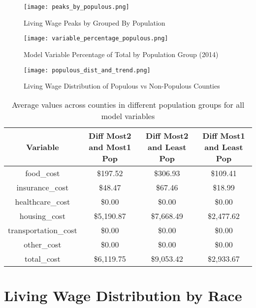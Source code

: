 \begin{figure}[H]
    \centering
        \texttt{[image: peaks\_by\_populous.png]}
        \caption{Living Wage Peaks by Grouped By Population}
    \label{f:ch4_peaks_by_populous}
\end{figure}

\begin{figure}[H]
    \centering
        \texttt{[image: variable\_percentage\_populous.png]}
        \caption{Model Variable Percentage of Total by Population Group (2014)}
    \label{f:ch4_variable_percentage_populous}
\end{figure}

\begin{figure}[H]
    \centering
        \texttt{[image: populous\_dist\_and\_trend.png]}
        \caption{Living Wage Distribution of Populous vs Non-Populous Counties}
    \label{f:ch4_populous_dist_and_trend}
\end{figure}

\begin{table}[H]
\centering
 \begin{tabular}{||c c c c||} 
 \hline
 Variable & Diff Most2 and Most1 Pop	& Diff Most2 and Least Pop & Diff Most1 and Least Pop \\ [0.5ex] 
 \hline\hline
 food\_cost & \$197.52 & \$306.93 & \$109.41 \\ 
 insurance\_cost & \$48.47 & \$67.46 & \$18.99 \\
 healthcare\_cost & \$0.00 &	\$0.00 & \$0.00 \\
 housing\_cost &	\$5,190.87 &	\$7,668.49 &	 \$2,477.62 \\
 transportation\_cost & \$0.00 & \$0.00 & \$0.00 \\
 other\_cost & \$0.00 & \$0.00 & \$0.00 \\
 total\_cost & \$6,119.75 & \$9,053.42 & \$2,933.67 \\ [1ex] 
 \hline
 \end{tabular}
 \caption{Average values across counties in different population groups for all model variables}
 \label{tab:ch4_table_variable_delta_by_population}
\end{table}




\section{Living Wage Distribution by Race}


